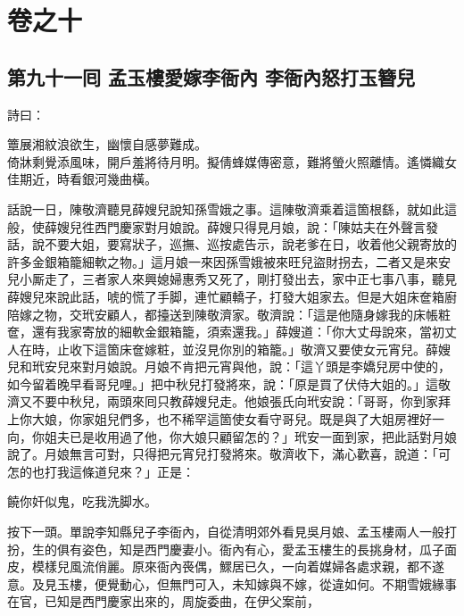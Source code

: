 \part*{{\titlename}卷之十}



\chapter*{第九十一囘 孟玉樓愛嫁李衙內 李衙內怒打玉簪兒}


詩曰：

\begin{myquote}
簟展湘紋浪欲生，幽懷自感夢難成。\\倚牀剩覺添風味，開戶羞將待月明。擬倩蜂媒傳密意，難將螢火照離情。遙憐織女佳期近，時看銀河幾曲橫。
\end{myquote}

話說一日，陳敬濟聽見薛嫂兒說知孫雪娥之事。這陳敬濟乘着這箇根繇，就如此這般，使薛嫂兒徃西門慶家對月娘說。薛嫂只得見月娘，說：「陳姑夫在外聲言發話，說不要大姐，要寫狀子，巡撫、巡按處告示，說老爹在日，收着他父親寄放的許多金銀箱籠細軟之物。」{}這月娘一來因孫雪娥被來旺兒盜財拐去，二者又是來安兒小厮走了，三者家人來興媳婦惠秀又死了，剛打發出去，家中正七事八事，聽見薛嫂兒來說此話，唬的慌了手脚，連忙顧轎子，打發大姐家去。但是大姐床奩箱廚陪嫁之物，交玳安顧人，都擡送到陳敬濟家。敬濟說：「這是他隨身嫁我的床帳粧奩，還有我家寄放的細軟金銀箱籠，須索還我。」薛嫂道：「你大丈母說來，當初丈人在時，止收下這箇床奩嫁粧，並沒見你別的箱籠。」敬濟又要使女元宵兒。薛嫂兒和玳安兒來對月娘說。月娘不肯把元宵與他，說：「這丫頭是李嬌兒房中使的，如今留着晚早看哥兒哩。」把中秋兒打發將來，說：「原是買了伏侍大姐的。」這敬濟又不要中秋兒，兩頭來囘只教薛嫂兒走。他娘張氏向玳安說：「哥哥，你到家拜上你大娘，你家姐兒們多，也不稀罕這箇使女看守哥兒。既是與了大姐房裡好一向，你姐夫已是收用過了他，你大娘只顧留怎的？」玳安一面到家，把此話對月娘說了。月娘無言可對，只得把元宵兒打發將來。敬濟收下，滿心歡喜，說道：「可怎的也打我這條道兒來？」正是：

\begin{myquote}
饒你奸似鬼，吃我洗脚水。
\end{myquote}

按下一頭。單說李知縣兒子李衙內，自從清明郊外看見吳月娘、孟玉樓兩人一般打扮，生的俱有姿色，知是西門慶妻小。衙內有心，愛孟玉樓生的長挑身材，瓜子面皮，模樣兒風流俏麗。原來衙內䘮偶，鰥居已久，一向着媒婦各處求親，都不遂意。及見玉樓，便覺動心，但無門可入，未知嫁與不嫁，從違如何。不期雪娥緣事在官，已知是西門慶家出來的，周旋委曲，在伊父案前，

